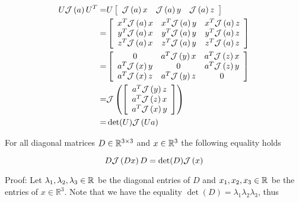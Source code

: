 \begin{align}
U\mathcal{J}\left( a \right)U^T
  =&U \left[\begin{array}{ccc}\mathcal{J}\left( a \right)x&\mathcal{J}\left( a \right)y&\mathcal{J}\left( a \right)z\end{array}\right]
\nonumber \\
  =&\left[
\begin{array}{ccc}
  x^T\mathcal{J}\left( a \right)x  & x^T\mathcal{J}\left( a \right)y  & x^T\mathcal{J}\left( a \right)z  \\
  y^T\mathcal{J}\left( a \right)x  & y^T\mathcal{J}\left( a \right)y  & y^T\mathcal{J}\left( a \right)z  \\
  z^T\mathcal{J}\left( a \right)x  & z^T\mathcal{J}\left( a \right)y  & z^T\mathcal{J}\left( a \right)z  \\
\end{array} \right]
\nonumber \\
  =&\left[
\begin{array}{ccc}
          0           & a^T\mathcal{J}\left( y \right)x  & a^T\mathcal{J}\left( z \right)x  \\
  a^T\mathcal{J}\left( x \right)y  &           0         & a^T\mathcal{J}\left( z \right)y  \\
  a^T\mathcal{J}\left( x \right)z  & a^T\mathcal{J}\left( y \right)z  &         0           \\
\end{array} \right]
\nonumber \\
  =&\mathcal{J}\left( \left[\begin{array}{ccc}a^T\mathcal{J}\left( y \right)z \\a^T\mathcal{J}\left( z \right)x \\a^T\mathcal{J}\left( x \right)y \\\end{array} \right] \right)
\nonumber \\
 =&\det(U)\mathcal{J}\left( Ua \right)
\end{align}
%


\begin{diagMat_Factorization}
\label{chModels.theo.diagMat_Factorization}
For all diagonal matrices $D\in\mathbb{R}^{3\times 3}$ and $x\in\mathbb{R}^{3}$ the
following equality holds

\begin{equation}
\label{chModels.eq.diagMat_Factorization}
D\mathcal{J}\left( Dx \right)D=\det(D)\mathcal{J}\left( x \right)
\end{equation}

\end{diagMat_Factorization}

\noindent Proof:
%
Let $\lambda_1,\lambda_2,\lambda_3\in\mathbb{R}^{}$ be the diagonal entries 
of $D$ and $x_1,x_2,x_3\in\mathbb{R}^{}$ be the entries of 
$x\in\mathbb{R}^3$.
%
Note that we have the equality
$\det\left(D\right)=\lambda_1\lambda_2\lambda_3$,
thus


